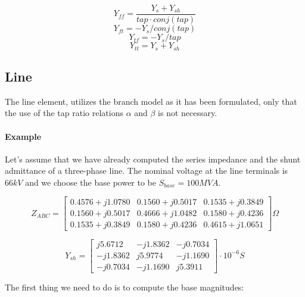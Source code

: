 \documentclass[nols,a4paper,twoside,notoc,fleqn]{tufte-book}
\begin{document}

$$Y_{ff} = \frac{Y_s + Y_{sh}}{tap \cdot conj(tap)}  $$
$$Y_{ft} = - Y_s / conj(tap)$$
$$Y_{tf} = - Y_s / tap$$
$$Y_{tt} = Y_s + Y_{sh}$$



\subsection{Line}

The line element, utilizes the branch model as it has been formulated, only that the use of the tap ratio relations $\alpha$ and $\beta$ is not necessary.






\paragraph{Example}

Let's assume that we have already computed the series impedance and the shunt admittance of a three-phase line. The nominal voltage at the line terminals is $66kV$ and we choose the base power to be $S_{base}=100MVA$.

$$
Z_{ABC} = \left[ \begin{array}{ccc}
0.4576 + j 1.0780 & 0.1560 + j0 .5017 & 0.1535 + j 0.3849 \\
0.1560 + j 0.5017 & 0.4666 + j 1.0482 & 0.1580 + j 0.4236 \\ 
0.1535 + j 0.3849 & 0.1580 + j 0.4236 & 0.4615 + j 1.0651
\end{array} \right] \Omega
$$

$$
Y_{sh} = \left[ \begin{array}{ccc}
j5.6712 & -j1.8362 & -j0.7034 \\
-j1.8362 & j5.9774 & -j1.1690 \\ 
-j0.7034 & -j1.1690 & j5.3911
\end{array} \right] \cdot 10^{-6}  S
$$

The first thing we need to do is to compute the base magnitudes:
\end{document}
